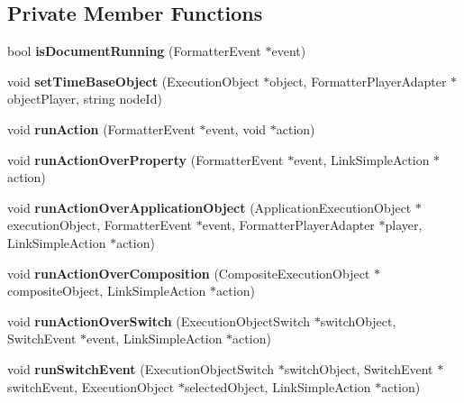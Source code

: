 \subsection*{Private Member Functions}
\begin{CompactItemize}
\item 
bool \textbf{isDocumentRunning} (FormatterEvent $\ast$event)\label{classbr_1_1pucrio_1_1telemidia_1_1ginga_1_1ncl_1_1FormatterScheduler_b3e80e645a2f5fd55a236dde15fe72b2}

\item 
void \textbf{setTimeBaseObject} (ExecutionObject $\ast$object, FormatterPlayerAdapter $\ast$objectPlayer, string nodeId)\label{classbr_1_1pucrio_1_1telemidia_1_1ginga_1_1ncl_1_1FormatterScheduler_9d82013652bc0adefd6cd3d0c2e555b3}

\item 
void \textbf{runAction} (FormatterEvent $\ast$event, void $\ast$action)\label{classbr_1_1pucrio_1_1telemidia_1_1ginga_1_1ncl_1_1FormatterScheduler_690bb2112bf373011dba3974a4e2b637}

\item 
void \textbf{runActionOverProperty} (FormatterEvent $\ast$event, LinkSimpleAction $\ast$action)\label{classbr_1_1pucrio_1_1telemidia_1_1ginga_1_1ncl_1_1FormatterScheduler_b29871da156a6dfc20d51628120b6ff0}

\item 
void \textbf{runActionOverApplicationObject} (ApplicationExecutionObject $\ast$executionObject, FormatterEvent $\ast$event, FormatterPlayerAdapter $\ast$player, LinkSimpleAction $\ast$action)\label{classbr_1_1pucrio_1_1telemidia_1_1ginga_1_1ncl_1_1FormatterScheduler_b3a5fbe30042040c16c493342667824a}

\item 
void \textbf{runActionOverComposition} (CompositeExecutionObject $\ast$compositeObject, LinkSimpleAction $\ast$action)\label{classbr_1_1pucrio_1_1telemidia_1_1ginga_1_1ncl_1_1FormatterScheduler_bb4be79487e23f3eca7260e346b9a859}

\item 
void \textbf{runActionOverSwitch} (ExecutionObjectSwitch $\ast$switchObject, SwitchEvent $\ast$event, LinkSimpleAction $\ast$action)\label{classbr_1_1pucrio_1_1telemidia_1_1ginga_1_1ncl_1_1FormatterScheduler_0295a56fe0e8ea4f5034fda56540439a}

\item 
void \textbf{runSwitchEvent} (ExecutionObjectSwitch $\ast$switchObject, SwitchEvent $\ast$switchEvent, ExecutionObject $\ast$selectedObject, LinkSimpleAction $\ast$action)\label{classbr_1_1pucrio_1_1telemidia_1_1ginga_1_1ncl_1_1FormatterScheduler_c573e1e83f74fc1db7659c1fc28d0f50}


\end{CompactItemize}
